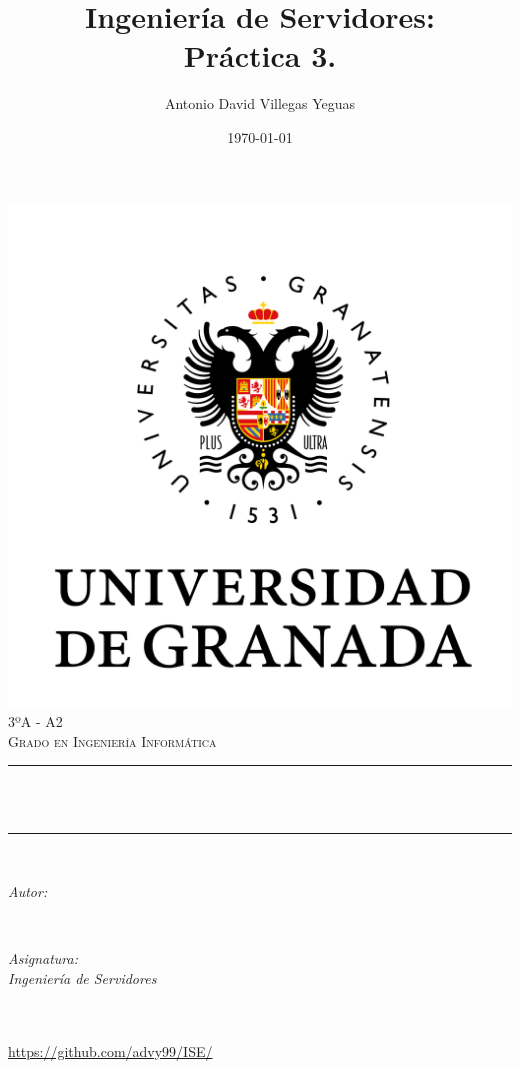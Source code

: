 \documentclass[12pt, spanish]{article}
\title{Ingeniería de Servidores:\\
Práctica 3. \hspace{0.05cm} }
\author{Antonio David Villegas Yeguas}
\date{\today}
\makeatletter
\let\thetitle\@title
\let\theauthor\@author
\let\thedate\@date
\makeatother
\begin{document}

\begin{titlepage}
    \centering
    \vspace*{0.5 cm}
    \includegraphics[scale = 0.50]{ugr.png}\\[1.0 cm]
    \textsc{\large 3ºA - A2}\\[0.5 cm]            
    \textsc{\large Grado en Ingeniería Informática}\\[0.5 cm]              
    \rule{\linewidth}{0.2 mm} \\[0.2 cm]
    { \huge \bfseries \thetitle}\\
    \rule{\linewidth}{0.2 mm} \\[1 cm]
    
    \begin{minipage}{0.4\textwidth}
        \begin{flushleft} \large
            \emph{Autor:}\\
            \theauthor
            \end{flushleft}
            \end{minipage}~
            \begin{minipage}{0.4\textwidth}
            \begin{flushright} \large
            \emph{Asignatura: \\
            Ingeniería de Servidores}                   
        \end{flushright}
    \end{minipage}\\[0.5cm]
  
    {\large \thedate}\\[0.5cm]
    {\url{https://github.com/advy99/ISE/}}
    {\doclicenseThis}
 	
    \vfill
    
\end{titlepage}
\end{document}
